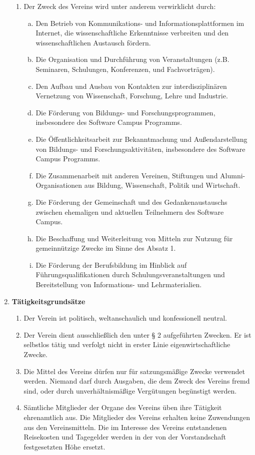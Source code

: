 \documentclass{article}
\begin{document}
\begin{enumerate}[§ 1.]
\begin{enumerate}[1.]
	\item Der Zweck des Vereins wird unter anderem verwirklicht durch:
		\begin{enumerate}[a.]
		\item Den Betrieb von Kommunikations- und Informationsplattformen im Internet,
			die wissenschaftliche Erkenntnisse verbreiten und den wissenschaftlichen Austausch fördern.
		\item Die Organisation und Durchführung von Veranstaltungen
			(z.B. Seminaren, Schulungen, Konferenzen, und Fachvorträgen).
		\item Den Aufbau und Ausbau von Kontakten zur interdisziplinären Vernetzung von Wissenschaft, Forschung, Lehre und Industrie.
		\item Die Förderung von Bildungs- und Forschungsprogrammen, insbesondere des Software Campus Programms.
		\item Die Öffentlichkeitsarbeit zur Bekanntmachung und Außendarstellung von
			Bildungs- und Forschungsaktivitäten, insbesondere des Software Campus Programms.
		\item Die Zusammenarbeit mit anderen Vereinen, Stiftungen und Alumni-Organisationen
			aus Bildung, Wissenschaft, Politik und Wirtschaft.
		\item Die Förderung der Gemeinschaft und des Gedankenaustauschs zwischen ehemaligen und aktuellen Teilnehmern des Software Campus.
		\item Die Beschaffung und Weiterleitung von Mitteln zur Nutzung für gemeinnützige Zwecke im Sinne des Absatz 1.
		\item Die Förderung der Berufsbildung im Hinblick auf Führungsqualifikationen durch Schulungsveranstaltungen
			und Bereitstellung von Informations- und Lehrmaterialien.
		\end{enumerate}
	\end{enumerate}

\item \textsf{\textbf{Tätigkeitsgrundsätze}}
	\begin{enumerate}[1.]
	\item Der Verein ist politisch, weltanschaulich und konfessionell neutral.
	\item Der Verein dient ausschließlich den unter § 2 aufgeführten Zwecken. Er ist
selbstlos tätig und verfolgt nicht in erster Linie eigenwirtschaftliche Zwecke.
	\item Die Mittel des Vereins dürfen nur für satzungsmäßige Zwecke verwendet werden.
Niemand darf durch Ausgaben, die dem Zweck des Vereins fremd sind, oder durch
unverhältnismäßige Vergütungen begünstigt werden.
	\item Sämtliche Mitglieder der Organe des Vereins üben ihre Tätigkeit ehrenamtlich aus.
Die Mitglieder des Vereins erhalten keine Zuwendungen aus den Vereinsmitteln.
Die im Interesse des Vereins entstandenen Reisekosten und Tagegelder werden
in der von der Vorstandschaft festgesetzten Höhe ersetzt.
	\end{enumerate}


\end{enumerate}
\end{document}
